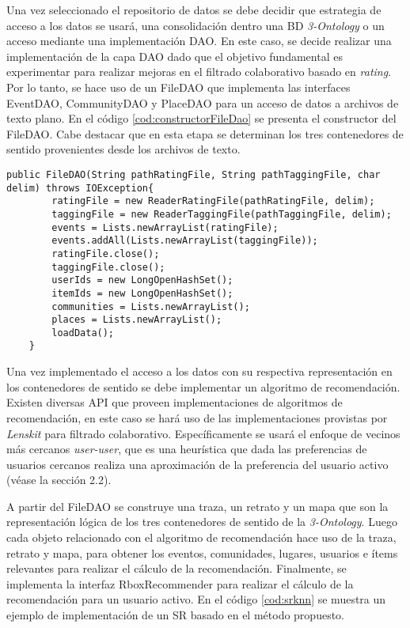 Una vez seleccionado el repositorio de datos se debe decidir que estrategia de acceso a los datos se usará, una consolidación dentro una BD \textit{3-Ontology} o un acceso mediante una implementación DAO. En este caso, se decide realizar una implementación de la capa DAO dado que el objetivo fundamental es experimentar para realizar mejoras en el filtrado colaborativo basado en \textit{rating}. Por lo tanto, se hace uso de un FileDAO que implementa las interfaces EventDAO, CommunityDAO y PlaceDAO para un acceso de datos a archivos de texto plano. En el código \ref{cod:constructorFileDao} se presenta el constructor del FileDAO. Cabe destacar que en esta etapa se determinan los tres contenedores de sentido provenientes desde los archivos de texto.

\begin{lstlisting}[float, caption = Constructor FileDAO, label = cod:constructorFileDao]
	public FileDAO(String pathRatingFile, String pathTaggingFile, char delim) throws IOException{
		ratingFile = new ReaderRatingFile(pathRatingFile, delim);
		taggingFile = new ReaderTaggingFile(pathTaggingFile, delim);
		events = Lists.newArrayList(ratingFile);
		events.addAll(Lists.newArrayList(taggingFile));
		ratingFile.close();
		taggingFile.close();
		userIds = new LongOpenHashSet();
		itemIds = new LongOpenHashSet();
		communities = Lists.newArrayList();
		places = Lists.newArrayList();
		loadData();
	}
\end{lstlisting}

Una vez implementado el acceso a los datos con su respectiva representación en los contenedores de sentido se debe implementar un algoritmo de recomendación. Existen diversas API que proveen implementaciones de algoritmos de recomendación, en este caso se hará uso de las implementaciones provistas por \textit{Lenskit} para filtrado colaborativo. Específicamente se usará el enfoque de vecinos más cercanos \textit{user-user}, que es una heurística que dada las preferencias de usuarios cercanos realiza una aproximación de la preferencia del usuario activo (véase la sección 2.2).

A partir del FileDAO se construye una traza, un retrato y un mapa que son la representación lógica de los tres contenedores de sentido de la \textit{3-Ontology}. Luego cada objeto relacionado con el algoritmo de recomendación hace uso de la traza, retrato y mapa, para obtener los eventos, comunidades, lugares, usuarios e ítems relevantes para realizar el cálculo de la recomendación. Finalmente, se implementa la interfaz RboxRecommender para realizar el cálculo de la recomendación para un usuario activo. En el código \ref{cod:srknn} se muestra un ejemplo de implementación de un SR basado en el método propuesto.

